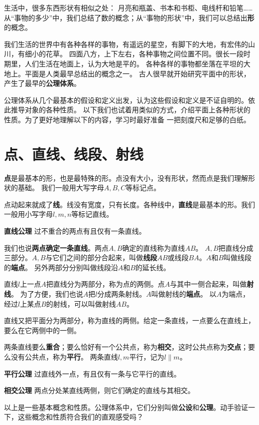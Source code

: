 \documentclass[12pt,UTF8]{ctexbook}
\begin{document}
生活中，很多东西形状有相似之处：
月亮和瓶盖、书本和书柜、电线杆和铅笔……
从“事物的多少”中，我们总结了数的概念；从“事物的形状”中，我们可以总结出\textbf{形}的概念。

我们生活的世界中有各种各样的事物，有遥远的星空，有脚下的大地，有宏伟的山川，有细小的花草。
四面八方，上下左右，各种事物之间位置不同。很长一段时期里，人们生活在地面上，认为大地是平的。
各种各样的事物都坐落在平坦的大地上。平面是人类最早总结出的概念之一。
古人很早就开始研究平面中的形状，产生了最早的\textbf{公理体系}。

公理体系从几个最基本的假设和定义出发，认为这些假设和定义是不证自明的。依此推导对象的各种性质。
以下我们也试着用类似的方式，介绍平面上各种形状的性质。为了更好地理解以下的内容，学习时最好准备
一把刻度尺和足够的白纸。

\section{点、直线、线段、射线}
\textbf{点}是最基本的形，也是最特殊的形。点没有大小，没有形状，然而点是我们理解形状的基础。
我们一般用大写字母$A,B,C$等标记点。

点动起来就成了\textbf{线}。线没有宽度，只有长度。各种线中，\textbf{直线}是最基本的形。我们一般用小写字母$l,m,n$等标记直线。
\begin{po}{\textbf{直线公理}}\label{po:0}
    过不重合的两点有且仅有一条直线。
\end{po}
我们也说\textbf{两点确定一条直线}。两点$A,B$确定的直线称为直线$AB$。
$A,B$把直线分成三部分。$A,B$与它们之间的部分合起来，叫做\textbf{线段}$AB$或线段$BA$。$A$和$B$叫做线段的\textbf{端点}。
另外两部分分别叫做线段沿$A$和$B$的延长线。

直线$l$上一点$A$把直线分为两部分，称为点的两侧。点$A$与其中一侧合起来，叫做\textbf{射线}。
为了方便，我们也说$A$把$l$分成两条射线。$A$叫做射线的\textbf{端点}。
以$A$为端点，经过$l$上某点$B$的射线，可以叫做射线$AB$。

直线又把平面分为两部分，称为直线的两侧。给定一条直线，一点要么在直线上，要么在它两侧中的一侧。

两条直线要么\textbf{重合}；要么恰好有一个公共点，称为\textbf{相交}，这时公共点称为\textbf{交点}；要么没有公共点，称为\textbf{平行}。
两条直线$l,m$平行，记为$l \parallel m$。
\begin{po}{\textbf{平行公理}}\label{po:1}
    过直线外一点，有且仅有一条与它平行的直线。
\end{po}
\begin{po}{\textbf{相交公理}}\label{po:2}
    两点分处某直线两侧，则它们确定的直线与其相交。
\end{po}
以上是一些基本概念和性质。公理体系中，它们分别叫做\textbf{公设}和\textbf{公理}。动手验证一下，这些概念和性质符合我们的直观感受吗？
\end{document}
